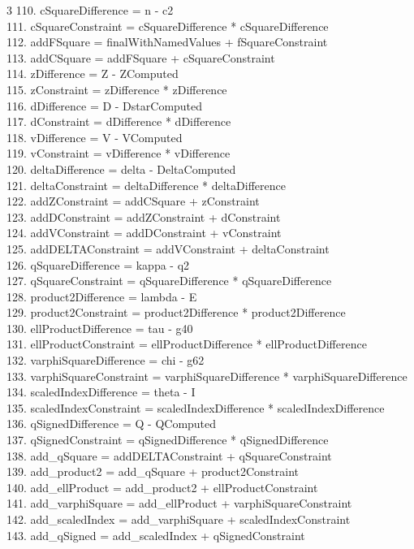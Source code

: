 \documentclass[10pt]{article}
\begin{document}
\begin{multicols}{3}
110. cSquareDifference = n - c2\\
111. cSquareConstraint = cSquareDifference * cSquareDifference\\
112. addFSquare = finalWithNamedValues + fSquareConstraint\\
113. addCSquare = addFSquare + cSquareConstraint\\
114. zDifference = Z - ZComputed\\
115. zConstraint = zDifference * zDifference\\
116. dDifference = D - DstarComputed\\
117. dConstraint = dDifference * dDifference\\
118. vDifference = V - VComputed\\
119. vConstraint = vDifference * vDifference\\
120. deltaDifference = delta - DeltaComputed\\
121. deltaConstraint = deltaDifference * deltaDifference\\
122. addZConstraint = addCSquare + zConstraint\\
123. addDConstraint = addZConstraint + dConstraint\\
124. addVConstraint = addDConstraint + vConstraint\\
125. addDELTAConstraint = addVConstraint + deltaConstraint\\
126. qSquareDifference = kappa - q2\\
127. qSquareConstraint = qSquareDifference * qSquareDifference\\
128. product2Difference = lambda - E\\
129. product2Constraint = product2Difference * product2Difference\\
130. ellProductDifference = tau - g40\\
131. ellProductConstraint = ellProductDifference * ellProductDifference\\
132. varphiSquareDifference = chi - g62\\
133. varphiSquareConstraint = varphiSquareDifference * varphiSquareDifference\\
134. scaledIndexDifference = theta - I\\
135. scaledIndexConstraint = scaledIndexDifference * scaledIndexDifference\\
136. qSignedDifference = Q - QComputed\\
137. qSignedConstraint = qSignedDifference * qSignedDifference\\
138. add\_qSquare = addDELTAConstraint + qSquareConstraint\\
139. add\_product2 = add\_qSquare + product2Constraint\\
140. add\_ellProduct = add\_product2 + ellProductConstraint\\
141. add\_varphiSquare = add\_ellProduct + varphiSquareConstraint\\
142. add\_scaledIndex = add\_varphiSquare + scaledIndexConstraint\\
143. add\_qSigned = add\_scaledIndex + qSignedConstraint\\
\end{multicols}
\end{document}
